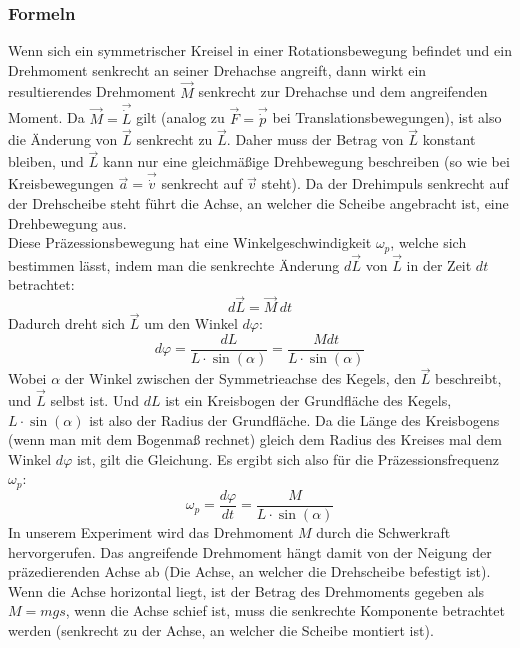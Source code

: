 \documentclass{article}
\begin{document}
	\subsubsection{Formeln}
	Wenn sich ein symmetrischer Kreisel in einer Rotationsbewegung befindet und ein Drehmoment senkrecht an seiner Drehachse angreift, dann wirkt ein resultierendes Drehmoment \( \vec M\) senkrecht zur Drehachse und dem angreifenden Moment.
	Da \( \vec M = \vec{\dot L} \) gilt (analog zu \(\vec F = \vec{\dot p}\) bei Translationsbewegungen), ist also die Änderung von \(\vec L\) senkrecht zu \(\vec L\).
	Daher muss der Betrag von \( \vec L \) konstant bleiben, und \( \vec L \) kann nur eine gleichmäßige Drehbewegung beschreiben (so wie bei Kreisbewegungen \(\vec a = \vec{\dot v}\) senkrecht auf \(\vec v\) steht). Da der Drehimpuls senkrecht auf der Drehscheibe steht führt die Achse, an welcher die Scheibe angebracht ist, eine Drehbewegung aus.\\ %
	Diese Präzessionsbewegung hat eine Winkelgeschwindigkeit \( \omega_p \), welche sich bestimmen lässt, indem man die senkrechte Änderung \( d\vec L \) von \( \vec L \) in der Zeit \( dt \) betrachtet:
	\begin{equation}
		d\vec L = \vec M \, d t
	\end{equation}
	Dadurch dreht sich \( \vec L \) um den Winkel \( d \varphi \):
	\begin{equation}
		d \varphi = \frac{ dL }{ L \cdot \sin(\alpha) } = \frac{ Mdt }{ L \cdot \sin(\alpha) }
	\end{equation}
    Wobei \(\alpha\) der Winkel zwischen der Symmetrieachse des Kegels, den \(\vec L\) beschreibt, und \(\vec L\) selbst ist. Und \(dL\) ist ein Kreisbogen der Grundfläche des Kegels, \( L \cdot \sin(\alpha) \) ist also der Radius der Grundfläche. Da die Länge des Kreisbogens (wenn man mit dem Bogenmaß rechnet) gleich dem Radius des Kreises mal dem Winkel \(d\varphi\) ist, gilt die Gleichung.
	Es ergibt sich also für die Präzessionsfrequenz \( \omega_p \):
	\begin{equation}\label{eq:omegap}
		\omega_p = \frac{ d\varphi }{ dt } = \frac{ M }{ L \cdot \sin(\alpha) }
	\end{equation}
	In unserem Experiment wird das Drehmoment \(M\) durch die Schwerkraft hervorgerufen. Das angreifende Drehmoment hängt damit von der Neigung der präzedierenden Achse ab (Die Achse, an welcher die Drehscheibe befestigt ist).
	Wenn die Achse horizontal liegt, ist der Betrag des Drehmoments gegeben als \(M = mgs\), wenn die Achse schief ist, muss die senkrechte Komponente betrachtet werden (senkrecht zu der Achse, an welcher die Scheibe montiert ist).
\end{document}
